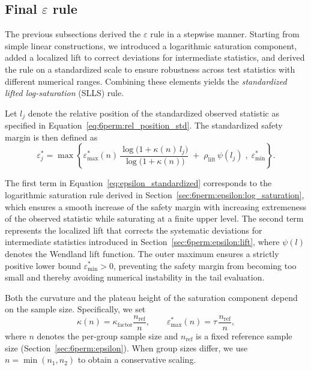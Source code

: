 \subsection{Final \texorpdfstring{$\varepsilon$}{epsilon} rule}
\label{sec:6perm:epsilon:final_rule}

The previous subsections derived the $\varepsilon$ rule in a stepwise manner. 
Starting from simple linear constructions, we introduced a logarithmic saturation component, added a localized lift to correct deviations for intermediate statistics, and derived the rule on a standardized scale to ensure robustness across test statistics with different numerical ranges. 
Combining these elements yields the \emph{standardized lifted log-saturation} (SLLS) rule.

Let $l_j$ denote the relative position of the standardized observed statistic as specified in Equation~\eqref{eq:6perm:rel_position_std}. The standardized safety margin is then defined as
\begin{equation}
\varepsilon_j^{\ast}
=
\max\!\left\{
\varepsilon^{\ast}_{\max}(n)\,
\frac{\log\!\big(1+\kappa(n)\,l_j\big)}{\log\!\big(1+\kappa(n)\big)}
\;+\;
\rho_{\mathrm{lift}}\,
\psi(l_j)
\;,\;
\varepsilon_{\min}^{\ast}
\right\}.
\label{eq:epsilon_standardized}
\end{equation}

The first term in Equation~\eqref{eq:epsilon_standardized} corresponds to the logarithmic saturation rule derived in Section~\ref{sec:6perm:epsilon:log_saturation}, which ensures a smooth increase of the safety margin with increasing extremeness of the observed statistic while saturating at a finite upper level. 
The second term represents the localized lift that corrects the systematic deviations for intermediate statistics introduced in Section~\ref{sec:6perm:epsilon:lift}, where $\psi(l)$ denotes the Wendland lift function. 
The outer maximum ensures a strictly positive lower bound $\varepsilon_{\min}^{\ast}>0$, preventing the safety margin from becoming too small and thereby avoiding numerical instability in the tail evaluation.

Both the curvature and the plateau height of the saturation component depend on the sample size. 
Specifically, we set
\begin{equation}
\kappa(n)=\kappa_{\mathrm{factor}}\frac{n_{\mathrm{ref}}}{n},
\qquad
\varepsilon^\ast_{\max}(n)=\tau\,\frac{n_{\mathrm{ref}}}{n},
\label{eq:epsilon_scaling}
\end{equation}
where $n$ denotes the per-group sample size and $n_{\mathrm{ref}}$ is a fixed reference sample size (Section~\ref{sec:6perm:epsilon}). 
When group sizes differ, we use $n=\min(n_1,n_2)$ to obtain a conservative scaling.

